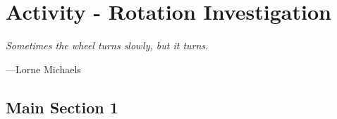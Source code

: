 
\chapter{Activity - Rotation Investigation} %

\label{Chapter5} %


\epigraph{\itshape Sometimes the wheel turns slowly, but it turns.}{---Lorne Michaels}

\section{Main Section 1}

\lipsum[1-3]
